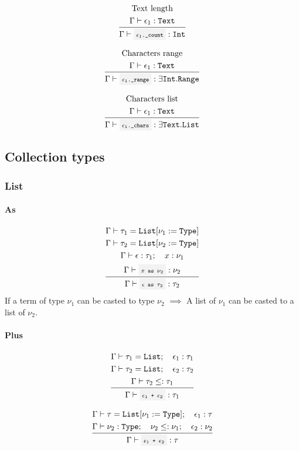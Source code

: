 \[
	\infrule{
		\text{Text length}\\*
		\EnvSym\then \expr_1:\Text
	}{
		\EnvSym\then \code{$\expr_1$.\_count}: \Int
	}
\]

\[
	\infrule{
		\text{Characters range}\\*
		\EnvSym\then \expr_1:\Text
	}{
		\EnvSym\then \code{$\expr_1$.\_range}: \exists\Int.\Range
	}
\]

\[
	\infrule{
		\text{Characters list}\\*
		\EnvSym\then \expr_1:\Text
	}{
		\EnvSym\then \code{$\expr_1$.\_chars}: \exists\Text.\List
	}
\]

\clearpage

\subsection{Collection types}

\subsubsection{List}

\paragraph{As}

\[
	\infrule{
		\EnvSym\then \tau_1 = \List[\nu_1 := \Type] \\*
		\EnvSym\then \tau_2 = \List[\nu_2 := \Type] \\*
		\EnvSym\then \expr:\tau_1 \semiq x:\nu_1 \\*
		\EnvSym\then \code{$x$ as $\nu_2$} : \nu_2
	}{
		\EnvSym\then \code{$\expr$ as $\tau_2$} : \tau_2
	}
\]
If a term of type $\nu_1$ can be casted to type $\nu_2$ $\implies$ A list
of $\nu_1$ can be casted to a list of $\nu_2$.

\paragraph{Plus}

\[
	\infrule{
		\EnvSym\then \tau_1=\List \semiq \expr_1:\tau_1 \\*
		\EnvSym\then \tau_2=\List \semiq \expr_2:\tau_2 \\*
		\EnvSym\then \tau_2 \narreq \tau_1
	}{
		\EnvSym\then \code{$\expr_1$ + $\expr_2$} : \tau_1
	}
\]

\[
	\infrule{
		\EnvSym\then \tau=\List[\nu_1:=\Type] \semiq \expr_1:\tau \\*
		\EnvSym\then \nu_2:\Type \semiq \nu_2\narreq\nu_1 \semiq \expr_2:\nu_2
	}{
		\EnvSym\then \code{$\expr_1$ + $\expr_2$} : \tau
	}
\]

